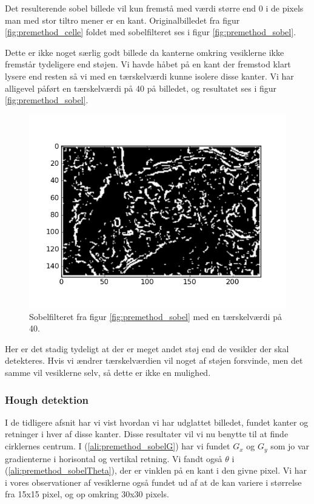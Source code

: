 Det resulterende sobel billede vil kun fremstå med værdi større end 0 i de pixels man med stor tiltro mener er en kant. Originalbilledet fra figur \ref{fig:premethod_celle} foldet med sobelfilteret ses i figur \ref{fig:premethod_sobel}. 

Dette er ikke noget særlig godt billede da kanterne omkring vesiklerne ikke fremstår tydeligere end støjen. Vi havde håbet på en kant der fremstod klart lysere end resten så vi med en tærskelværdi kunne isolere disse kanter. Vi har alligevel påført en tærskelværdi på 40 på billedet, og resultatet ses i figur \ref{fig:premethod_sobel}.

\begin{figure}[H]
	\centering
	\includegraphics[scale=0.8]{files/premethod/img/edgemap.png}
	\caption{Sobelfilteret fra figur \ref{fig:premethod_sobel} med en tærskelværdi på 40.\label{fig:premethod_edgemap}}
\end{figure}

Her er det stadig tydeligt at der er meget andet støj end de vesikler der skal detekteres. Hvis vi ændrer tærskelværdien vil noget af støjen forsvinde, men det samme vil vesiklerne selv, så dette er ikke en mulighed.

\subsubsection{Hough detektion}\label{premethod_hough}
I de tidligere afsnit har vi vist hvordan vi har udglattet billedet, fundet kanter og retninger i hver af disse kanter. Disse resultater vil vi nu benytte til at finde cirklernes centrum. I (\ref{ali:premethod_sobelG}) har vi fundet $G_x$ og $G_y$ som jo var gradienterne i horisontal og vertikal retning. Vi fandt også $\theta$ i (\ref{ali:premethod_sobelTheta}), der er vinklen på en kant i den givne pixel. Vi har i vores observationer af vesiklerne også fundet ud af at de kan variere i størrelse fra 15x15 pixel, og op omkring 30x30 pixels.

